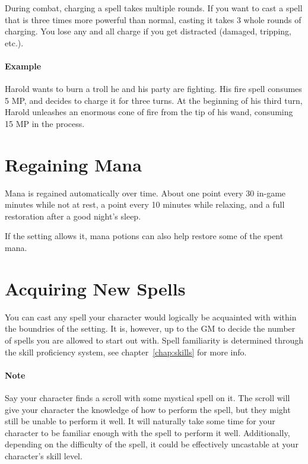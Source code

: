 During combat, charging a spell takes multiple rounds.
If you want to cast a spell that is three times more powerful than normal, casting it takes 3 whole rounds of charging.
You lose any and all charge if you get distracted (damaged, tripping, etc.).

\paragraph{Example} Harold wants to burn a troll he and his party are fighting.
His fire spell consumes 5 MP, and decides to charge it for three turns.
At the beginning of his third turn, Harold unleashes an enormous cone of fire from the tip of his wand, consuming 15 MP in the process.

\section{Regaining Mana}
Mana is regained automatically over time.
About one point every 30 in-game minutes while not at rest,
a point every 10 minutes while relaxing,
and a full restoration after a good night's sleep.

If the setting allows it, mana potions can also help restore some of the spent mana.

\section{Acquiring New Spells}
You can cast any spell your character would logically be acquainted with within the boundries of the setting.
It is, however, up to the GM to decide the number of spells you are allowed to start out with.
Spell familiarity is determined through the skill proficiency system, see chapter~\ref{chap:skills} for more info.

\paragraph{Note} Say your character finds a scroll with some mystical spell on it.
The scroll will give your character the knowledge of how to perform the spell, but they might still be unable to perform it well.
It will naturally take some time for your character to be familiar enough with the spell to perform it well.
Additionally, depending on the difficulty of the spell, it could be effectively uncastable at your character's skill level.

